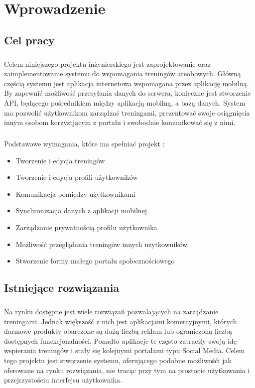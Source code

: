 \chapter{Wprowadzenie}

\section{Cel pracy}
\label{sec:cel_pracy}
\paragraph{}
Celem niniejszego projektu inżynierskiego jest zaprojektowanie oraz zaimplementowanie systemu do wspomagania treningów areobowych. Główną częścią systemu jest aplikacja internetowa wspomagana przez aplikację mobilną. By zapewnić możliwość przesyłania danych do serwera, konieczne jest stworzenie API, będącego pośrednikiem między aplikacją mobilną, a bazą danych.
System ma pozwolić użytkownikom zarządzać treningami, prezentować swoje osiągnięcia innym osobom korzystjącym z portalu i swobodnie komunikować się z nimi.
\paragraph{} %
\label{par:}
Podstawowe wymagania, które ma spełniać projekt :
\begin{itemize}
	\item Tworzenie i edycja treningów
	\item Tworzenie i edycja profili użytkowników
	\item Komunikacja pomiędzy użytkownikami
	\item Synchronizacja danych z aplikacji mobilnej
	\item Zarządzanie prywatnością profilu użytkownika
	\item Możliwość przeglądania treningów innych użytkowników
	\item Stworzenie formy małego portalu społecznościowego
\end{itemize}

\section{Istniejące rozwiązania}
\paragraph{}
Na rynku dostępne jest wiele rozwiązań pozwalających na zarządzanie treningami. Jednak większość z nich jest aplikacjami komercyjnymi, których darmowe produkty obarczone są dużą liczbą reklam lub ograniczoną liczbą dostępnych funckcjonalności. Ponadto aplikacje te często zatraciły swoją idę wspierania treningów i stały się kolejnymi portalami typu Social Media. Celem tego projektu jest stworzenie systemu, oferującego podobne możliwośći jak oferowane na rynku rozwiązania, nie tracąc przy tym na prostocie użytkowania i przejrzystościu interfejsu użytkownika.

